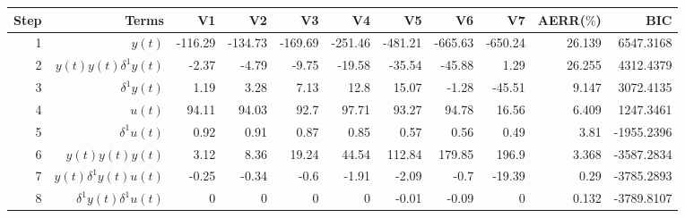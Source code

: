 \begin{tabular}{rrrrrrrrrrr}
Step & Terms & V1 & V2 & V3 & V4 & V5 & V6 & V7 & AERR($\%$) & BIC \\ 
\hline 
1 & $y(t)$ & -116.29 & -134.73 & -169.69 & -251.46 & -481.21 & -665.63 & -650.24 & 26.139 & 6547.3168 \\ 
2 & $y(t)y(t)\delta^1 y(t)$ & -2.37 & -4.79 & -9.75 & -19.58 & -35.54 & -45.88 & 1.29 & 26.255 & 4312.4379 \\ 
3 & $\delta^1 y(t)$ & 1.19 & 3.28 & 7.13 & 12.8 & 15.07 & -1.28 & -45.51 & 9.147 & 3072.4135 \\ 
4 & $u(t)$ & 94.11 & 94.03 & 92.7 & 97.71 & 93.27 & 94.78 & 16.56 & 6.409 & 1247.3461 \\ 
5 & $\delta^1 u(t)$ & 0.92 & 0.91 & 0.87 & 0.85 & 0.57 & 0.56 & 0.49 & 3.81 & -1955.2396 \\ 
6 & $y(t)y(t)y(t)$ & 3.12 & 8.36 & 19.24 & 44.54 & 112.84 & 179.85 & 196.9 & 3.368 & -3587.2834 \\ 
7 & $y(t)\delta^1 y(t)u(t)$ & -0.25 & -0.34 & -0.6 & -1.91 & -2.09 & -0.7 & -19.39 & 0.29 & -3785.2893 \\ 
8 & $\delta^1 y(t)\delta^1 u(t)$ & 0 & 0 & 0 & 0 & -0.01 & -0.09 & 0 & 0.132 & -3789.8107 \\ 
\hline 
\end{tabular}